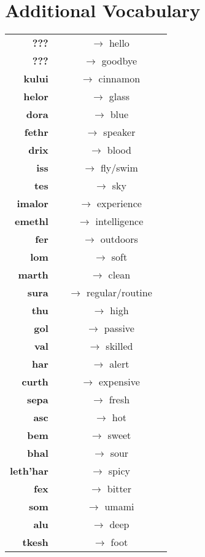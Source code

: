 \twocolumn

\section*{Additional Vocabulary}

\begin{tabular}{r c c l}
\textbf{???} &&$\rightarrow$ hello \\
\textbf{???} &&$\rightarrow$ goodbye \\
\textbf{kului} &&$\rightarrow$ cinnamon \\
\textbf{helor} &&$\rightarrow$ glass \\
\textbf{dora} &&$\rightarrow$ blue \\
\textbf{fethr} &&$\rightarrow$ speaker \\
\textbf{drix} &&$\rightarrow$ blood \\
\textbf{iss} &&$\rightarrow$ fly/swim \\
\textbf{tes} &&$\rightarrow$ sky \\
\textbf{imalor} &&$\rightarrow$ experience \\
\textbf{emethl} &&$\rightarrow$ intelligence \\
\textbf{fer} &&$\rightarrow$ outdoors \\
\textbf{lom} &&$\rightarrow$ soft \\
\textbf{marth} &&$\rightarrow$ clean \\
\textbf{sura} &&$\rightarrow$ regular/routine \\
\textbf{thu} &&$\rightarrow$ high \\
\textbf{gol} &&$\rightarrow$ passive \\
\textbf{val} &&$\rightarrow$ skilled \\
\textbf{har} &&$\rightarrow$ alert \\
\textbf{curth} &&$\rightarrow$ expensive \\
\textbf{sepa} &&$\rightarrow$ fresh \\
\textbf{asc} &&$\rightarrow$ hot \\
\textbf{bem} &&$\rightarrow$ sweet \\
\textbf{bhal} &&$\rightarrow$ sour \\
\textbf{leth'har} &&$\rightarrow$ spicy \\
\textbf{fex} &&$\rightarrow$ bitter \\
\textbf{som} &&$\rightarrow$ umami \\
\textbf{alu} &&$\rightarrow$ deep \\
\textbf{tkesh} &&$\rightarrow$ foot \\

\end{tabular}

